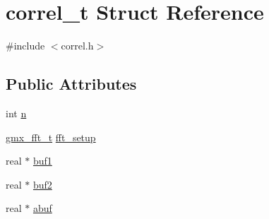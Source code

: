 \hypertarget{structcorrel__t}{\section{correl\-\_\-t \-Struct \-Reference}
\label{structcorrel__t}
}


{\ttfamily \#include $<$correl.\-h$>$}

\subsection*{\-Public \-Attributes}
\begin{DoxyCompactItemize}
\item 
int \hyperlink{structcorrel__t_a86c101730240d7b3053b5a8e3638e9fb}{n}
\item 
\hyperlink{include_2gmx__fft_8h_ac4aa41b4b80187da5d55a98e5f63a025}{gmx\-\_\-fft\-\_\-t} \hyperlink{structcorrel__t_abaa348f82f1bf274a8ab865c487e05be}{fft\-\_\-setup}
\item 
real $\ast$ \hyperlink{structcorrel__t_afcd83c84bf890b7b205c432d34f5c95d}{buf1}
\item 
real $\ast$ \hyperlink{structcorrel__t_a5ce5e0a8bebd5bf7fe33463e4411179f}{buf2}
\item 
real $\ast$ \hyperlink{structcorrel__t_a61d67c4f5fe9fecd12fdfa62f908670c}{abuf}
\end{DoxyCompactItemize}


